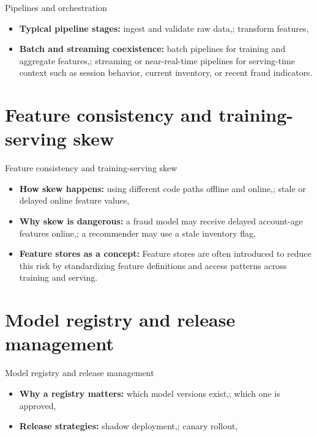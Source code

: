\documentclass[aspectratio=169]{beamer}
\begin{document}
\begin{frame}{Pipelines and orchestration}
  \begin{itemize}
    \item \textbf{Typical pipeline stages:} ingest and validate raw data,; transform features,
    \item \textbf{Batch and streaming coexistence:} batch pipelines for training and aggregate features,; streaming or near-real-time pipelines for serving-time context such as session behavior, current inventory, or recent fraud indicators.
  \end{itemize}
\end{frame}

\section{Feature consistency and training-serving skew}

\begin{frame}{Feature consistency and training-serving skew}
  \begin{itemize}
    \item \textbf{How skew happens:} using different code paths offline and online,; stale or delayed online feature values,
    \item \textbf{Why skew is dangerous:} a fraud model may receive delayed account-age features online,; a recommender may use a stale inventory flag,
    \item \textbf{Feature stores as a concept:} Feature stores are often introduced to reduce this risk by standardizing feature definitions and access patterns across training and serving.
  \end{itemize}
\end{frame}

\section{Model registry and release management}

\begin{frame}{Model registry and release management}
  \begin{itemize}
    \item \textbf{Why a registry matters:} which model versions exist,; which one is approved,
    \item \textbf{Release strategies:} shadow deployment,; canary rollout,
  \end{itemize}
\end{frame}
\end{document}
